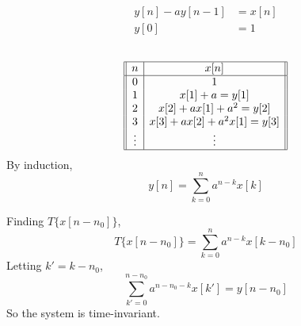 \documentclass{article}
\begin{document}
\newpage
\section{}

\begin{align}
    y[n] - ay[n - 1] &= x[n] \\
    y[0] &= 1
\end{align}

\subsection{}

\begin{equation}
    \begin{array}[]{||c|c||}
        \hline
        n & x[n] \\
        \hline
        0 & 1 \\
        1 & x[1] + a = y[1] \\
        2 & x[2] + a x[1] + a^2 = y[2] \\
        3 & x[3] + a x[2] + a^2 x[1] = y[3] \\
        \vdots & \vdots \\
        \hline
    \end{array}
\end{equation}
By induction,
\begin{equation}
    y[n] = \sum_{k = 0}^n a^{n - k} x[k]
\end{equation}

Finding \(T\{x[n - n_0]\}\),
\begin{equation}
    T\{x[n - n_0]\} = \sum_{k = 0}^{n} a^{n - k} x[k - n_0]
\end{equation}
Letting \(k' = k - n_0\),
\begin{equation}
    \sum_{k' = 0}^{n - n_0} a^{n - n_0 - k} x[k'] = y[n - n_0]
\end{equation}
So the system is time-invariant.

\subsection{}
\end{document}
